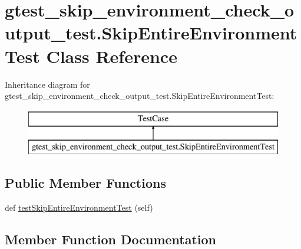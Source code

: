 \hypertarget{classgtest__skip__environment__check__output__test_1_1_skip_entire_environment_test}{}\section{gtest\+\_\+skip\+\_\+environment\+\_\+check\+\_\+output\+\_\+test.\+Skip\+Entire\+Environment\+Test Class Reference}
\label{classgtest__skip__environment__check__output__test_1_1_skip_entire_environment_test}
Inheritance diagram for gtest\+\_\+skip\+\_\+environment\+\_\+check\+\_\+output\+\_\+test.\+Skip\+Entire\+Environment\+Test\+:\begin{figure}[H]
\begin{center}
\leavevmode
\includegraphics[height=2.000000cm]{df/df4/classgtest__skip__environment__check__output__test_1_1_skip_entire_environment_test}
\end{center}
\end{figure}
\subsection*{Public Member Functions}
\begin{DoxyCompactItemize}
\item 
def \mbox{\hyperlink{classgtest__skip__environment__check__output__test_1_1_skip_entire_environment_test_a9268ce42dc9a4382dc7da903b79061ce}{test\+Skip\+Entire\+Environment\+Test}} (self)
\end{DoxyCompactItemize}


\subsection{Member Function Documentation}
\mbox{\label{classgtest__skip__environment__check__output__test_1_1_skip_entire_environment_test_a9268ce42dc9a4382dc7da903b79061ce}} 
